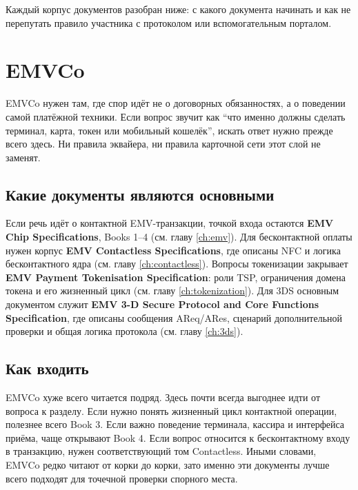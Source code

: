 Каждый корпус документов разобран ниже: с какого документа начинать
и как не перепутать правило участника с протоколом
или вспомогательным порталом.

\section{EMVCo}
\label{sec:ps-emvco}

EMVCo нужен там, где спор идёт не о договорных обязанностях,
а о поведении самой платёжной техники. Если вопрос звучит как
\enquote{что именно должны сделать терминал, карта, токен
или мобильный кошелёк}, искать ответ нужно прежде всего здесь.
Ни правила эквайера, ни правила карточной сети этот слой
не заменят.

\subsection*{Какие документы являются основными}

Если речь идёт о контактной EMV-транзакции, точкой входа остаются
\textbf{EMV Chip Specifications}, Books 1--4
(см. главу \ref{ch:emv}). Для бесконтактной оплаты нужен корпус
\textbf{EMV Contactless Specifications}, где описаны NFC
и логика бесконтактного ядра
(см. главу \ref{ch:contactless}). Вопросы токенизации закрывает
\textbf{EMV Payment Tokenisation Specification}: роли TSP,
ограничения домена токена и его жизненный цикл
(см. главу \ref{ch:tokenization}). Для 3DS основным документом
служит \textbf{EMV 3-D Secure Protocol and Core Functions
Specification}, где описаны сообщения AReq/ARes, сценарий
дополнительной проверки и общая логика протокола
(см. главу \ref{ch:3ds}).




\subsection*{Как входить}

EMVCo хуже всего читается подряд. Здесь почти всегда выгоднее идти
от вопроса к разделу. Если нужно понять жизненный цикл контактной
операции, полезнее всего Book 3. Если важно поведение терминала,
кассира и интерфейса приёма, чаще открывают Book 4. Если вопрос
относится к бесконтактному входу в транзакцию, нужен соответствующий
том Contactless. Иными словами, EMVCo редко читают от корки
до корки, зато именно эти документы лучше всего подходят
для точечной проверки спорного места.

